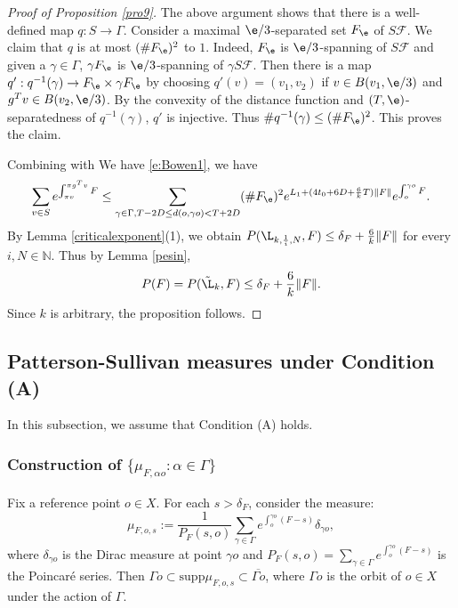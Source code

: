 \documentclass[11pt]{amsart}
\newtheorem{corollary}[theorem]{Corollary}
\theoremstyle{definition}
\newcommand{\F}{\mathcal{F}}
\def\NN{{\mathbb N}}
\def\a{\alpha}
\def\c{\gamma}   \def\C{\Gamma}
\begin{document}
\begin{proof}[Proof of Proposition \ref{pro9}]
The above argument shows that there is a well-defined map $q: S\to \Gamma$.
Consider a maximal $\e/3$-separated set $F_\e$ of $S\F$. We claim that $q$ is at most $(\# F_{\e})^2$ to $1$.
Indeed, $F_\e$ is $\e/3$-spanning of $S\F$ and given a $\c\in \C$, $\c F_\e$ is $\e/3$-spanning of $\c S\F$. Then there is a map $q': q^{-1}(\c)\to F_\e\times \c F_\e$ by choosing $q'(v)=(v_1,v_2)$ if $v\in B(v_1,\e/3)$ and $g^Tv\in B(v_2,\e/3)$. By the convexity of the distance function and $(T,\e)$-separatedness of $q^{-1}(\c)$, $q'$ is injective. Thus $\# q^{-1}(\c)\le (\# F_{\e})^2$. This proves the claim.

Combining with We have \eqref{e:Bowen1}, we have
\begin{equation*}
\begin{aligned}
\sum_{v \in S}e^{\int_{\pi v}^{\pi g^T v}F}\le \sum_{\c \in \Gamma, T-2D\le d(o, \c o)<T+2D} (\# F_{\e})^2 e^{L_1+(4t_0+6D+\frac{6}{k}T)\|F\|}e^{\int_{o}^{\c o}F}.
\end{aligned}
\end{equation*}
By Lemma \ref{criticalexponent}(1), we obtain $P(\L_{k,\frac{1}{i},N},F)\le \delta_F+\frac{6}{k}\|F\|$ for every $i,N\in \NN$. Thus by Lemma \ref{pesin},
$$P(F)=P(\tilde{\L}_k,F)\le \delta_F+\frac{6}{k}\|F\|.$$ 
Since $k$ is arbitrary, the proposition follows.
\end{proof}

\subsection{Patterson-Sullivan measures under Condition (A)}
In this subsection, we assume that Condition (A) holds.
\subsubsection{Construction of $\{\mu_{F, \a o}: \a\in\C\}$}
Fix a reference point $o\in X$. For each $s > \delta_F$, consider the measure:
$$\mu_{F,o,s}:=\frac{1}{P_F(s,o)}\sum_{\c \in \Gamma}e^{\int_o^{\gamma o}(F-s)}\delta_{\c o},$$
where $\delta_{\c o}$ is the Dirac measure at point $\c o$ and $P_F(s,o)=\sum_{\c\in \C}e^{\int_o^{\gamma o}(F-s)}$ is the Poincar\'{e} series.
Then $\Gamma o \subset \text{supp} \mu_{F,o,s} \subset \overline{\Gamma o}$, where $\Gamma o$ is the orbit of $o\in X$ under the action of $\Gamma$.
\end{document}
